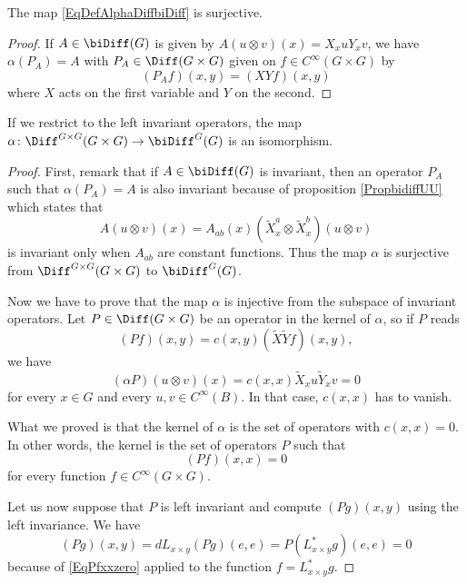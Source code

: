 \begin{lemma}
	The map \eqref{EqDefAlphaDiffbiDiff} is surjective.
\end{lemma}

\begin{proof}
	If $A\in\biDiff(G)$ is given by $A(u\otimes v)(x)=X_xuY_xv$, we have $\alpha(P_A)=A$ with $P_A\in\Diff(G\times G)$ given on $f\in C^{\infty}(G\times G)$ by
	\begin{equation}
		(P_Af)(x,y)=(XYf)(x,y)
	\end{equation}
	where $X$ acts on the first variable and $Y$ on the second.
\end{proof}

\begin{proposition}
	If we restrict to the left invariant operators, the map $\alpha\colon \Diff^{G\times G}(G\times G)\to \biDiff^G(G)$ is an isomorphism.
\end{proposition}

\begin{proof}
	First, remark that if $A\in\biDiff(G)$ is invariant, then an operator $P_A$ such that $\alpha(P_A)=A$ is also invariant because of proposition \ref{PropbidiffUU} which states that
	\begin{equation}
		A(u\otimes v)(x)=A_{ab}(x)(\tilde X^a_x\otimes \tilde X^b_x)(u\otimes v)
	\end{equation}
	is invariant only when $A_{ab}$ are constant functions. Thus the map $\alpha$ is surjective from $\Diff^{G\times G}(G\times G)$ to $\biDiff^G(G)$.

	Now we have to prove that the map $\alpha$ is injective from the subspace of invariant operators. Let $P\in\Diff(G\times G)$ be an operator in the kernel of $\alpha$, so if $P$ reads
	\begin{equation}
		(Pf)(x,y)=c(x,y)(\tilde X\tilde Yf)(x,y),
	\end{equation}
	we have
	\begin{equation}
		(\alpha P)(u\otimes v)(x)=c(x,x)\tilde X_xu\tilde Y_xv=0
	\end{equation}
	for every $x\in G$ and every $u,v\in C^{\infty}(B)$. In that case, $c(x,x)$ has to vanish.

	What we proved is that the kernel of $\alpha$ is the set of operators with $c(x,x)=0$. In other words, the kernel is the set of operators $P$ such that
	\begin{equation}	\label{EqPfxxzero}
		(Pf)(x,x)=0
	\end{equation}
	for every function $f\in C^{\infty}(G\times G)$.

	Let us now suppose that $P$ is left invariant and compute $(Pg)(x,y)$ using the left invariance. We have
	\begin{equation}
		(Pg)(x,y)=dL_{x\times y}(Pg)(e,e)=P(L^*_{x\times y}g)(e,e)=0
	\end{equation}
	because of \eqref{EqPfxxzero} applied to the function $f=L^*_{x\times y}g$.
\end{proof}


